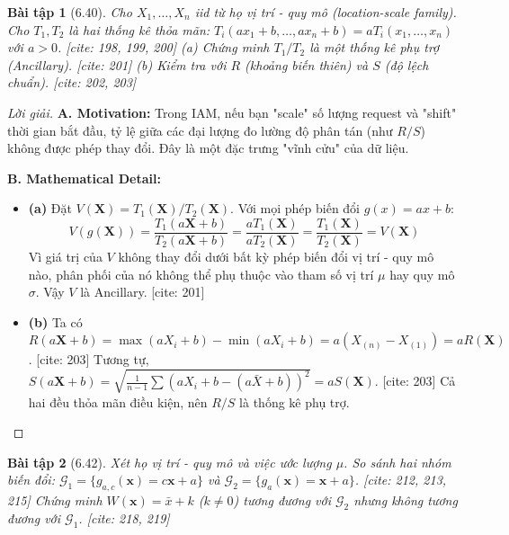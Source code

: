 \documentclass[8pt,a4paper]{article}
\newtheorem{exercise}{Bài tập}
\newenvironment{solution}{\begin{proof}[Lời giải]}{\end{proof}}
\begin{document}
\begin{exercise}[6.40]
Cho $X_1, \dots, X_n$ iid từ họ vị trí - quy mô (location-scale family). Cho $T_1, T_2$ là hai thống kê thỏa mãn:
$T_i(ax_1+b, \dots, ax_n+b) = aT_i(x_1, \dots, x_n)$ với $a > 0$. [cite: 198, 199, 200]
(a) Chứng minh $T_1/T_2$ là một thống kê phụ trợ (Ancillary). [cite: 201]
(b) Kiểm tra với $R$ (khoảng biến thiên) và $S$ (độ lệch chuẩn). [cite: 202, 203]
\end{exercise}

\begin{solution}
\textbf{A. Motivation:} Trong IAM, nếu bạn "scale" số lượng request và "shift" thời gian bắt đầu, tỷ lệ giữa các đại lượng đo lường độ phân tán (như $R/S$) không được phép thay đổi. Đây là một đặc trưng "vĩnh cửu" của dữ liệu.

\textbf{B. Mathematical Detail:}
\begin{itemize}
    \item \textbf{(a)} Đặt $V(\mathbf{X}) = T_1(\mathbf{X})/T_2(\mathbf{X})$. 
    Với mọi phép biến đổi $g(x) = ax+b$:
    \[ V(g(\mathbf{X})) = \frac{T_1(a\mathbf{X}+b)}{T_2(a\mathbf{X}+b)} = \frac{aT_1(\mathbf{X})}{aT_2(\mathbf{X})} = \frac{T_1(\mathbf{X})}{T_2(\mathbf{X})} = V(\mathbf{X}) \]
    Vì giá trị của $V$ không thay đổi dưới bất kỳ phép biến đổi vị trí - quy mô nào, phân phối của nó không thể phụ thuộc vào tham số vị trí $\mu$ hay quy mô $\sigma$. Vậy $V$ là Ancillary. [cite: 201]
    \item \textbf{(b)} Ta có $R(a\mathbf{X}+b) = \max(aX_i+b) - \min(aX_i+b) = a(X_{(n)} - X_{(1)}) = aR(\mathbf{X})$. [cite: 203]
    Tương tự, $S(a\mathbf{X}+b) = \sqrt{\frac{1}{n-1}\sum (aX_i+b - (a\bar{X}+b))^2} = aS(\mathbf{X})$. [cite: 203]
    Cả hai đều thỏa mãn điều kiện, nên $R/S$ là thống kê phụ trợ.
\end{itemize}
\end{solution}

\begin{exercise}[6.42]
Xét họ vị trí - quy mô và việc ước lượng $\mu$. So sánh hai nhóm biến đổi:
$\mathcal{G}_1 = \{g_{a,c}(\mathbf{x}) = c\mathbf{x} + a\}$ và $\mathcal{G}_2 = \{g_{a}(\mathbf{x}) = \mathbf{x} + a\}$. [cite: 212, 213, 215]
Chứng minh $W(\mathbf{x}) = \bar{x} + k$ ($k \neq 0$) tương đương với $\mathcal{G}_2$ nhưng không tương đương với $\mathcal{G}_1$. [cite: 218, 219]
\end{exercise}
\end{document}
